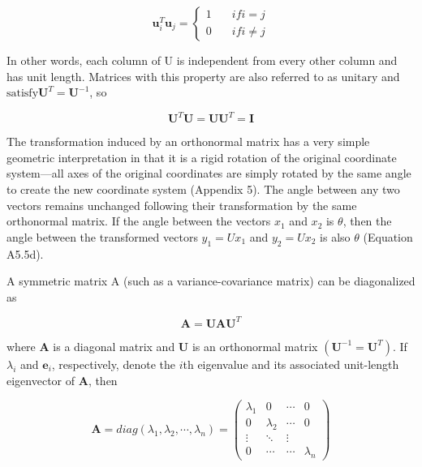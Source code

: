 \documentclass{article}
\begin{document}
\begin{equation}
\mathbf{u}_{i}^{T}\mathbf{u}_{j}=\left\{\begin{aligned}1&\quad if i=j\\ 0&\quad if i\neq j\end{aligned}\right.
\end{equation}

In other words, each column of U is independent from every other column and has unit length. Matrices with this property are also referred to as  $ \text{unitary} $ and  $ \text{satisfy} \mathbf{U}^T = \mathbf{U}^{-1} $, so

\begin{equation}
\mathbf{U}^{T}\mathbf{U}=\mathbf{U}\mathbf{U}^{T}=\mathbf{I}
\tag{30.22}
\label{eq:30_22}
\end{equation}

The transformation induced by an orthonormal matrix has a very simple geometric interpretation in that it is a rigid rotation of the original coordinate system—all axes of the original coordinates are simply rotated by the same angle to create the new coordinate system (Appendix 5). The angle between any two vectors remains unchanged following their transformation by the same orthonormal matrix. If the angle between the vectors  $ x_1 $ and  $ x_2 $ is  $ \theta $, then the angle between the transformed vectors  $ y_1 = Ux_1 $ and  $ y_2 = Ux_2 $ is also  $ \theta $ (Equation A5.5d).

A symmetric matrix A (such as a variance-covariance matrix) can be diagonalized as

\begin{equation}
\mathbf{A}=\mathbf{U}\mathbf{A}\mathbf{U}^{T}
\tag{30.23}
\label{eq:30_23}
\end{equation}

where  $ \mathbf{A} $ is a diagonal matrix and  $ \mathbf{U} $ is an orthonormal matrix  $ (\mathbf{U}^{-1} = \mathbf{U}^T) $. If  $ \lambda_i $ and  $ \mathbf{e}_i $, respectively, denote the  $ i $th eigenvalue and its associated unit-length eigenvector of  $ \mathbf{A} $, then

\begin{equation}
\boldsymbol{A}=diag(\lambda_{1},\lambda_{2},\cdots,\lambda_{n})=\begin{pmatrix}{{{\lambda_{1}}}}&{{{0}}}&{{{\cdots}}}&{{{0}}} \\{{{0}}}&{{{\lambda_{2}}}}&{{{\cdots}}}&{{{0}}} \\{{{\vdots}}}&{{{\ddots}}}&{{{\vdots}}} \\{{{0}}}&{{{\cdots}}}&{{{\cdots}}}&{{{\lambda_{n}}}}\end{pmatrix}
\tag{30.24a}
\label{eq:30_24a}
\end{equation}
\end{document}
